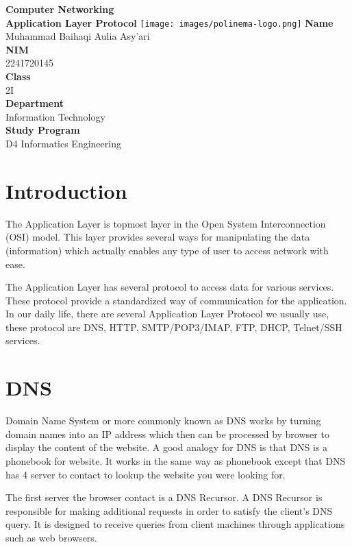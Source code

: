 \documentclass[12pt,titlepage]{article}
\newcommand{\vSubject}{Computer Networking}
\newcommand{\vSubtitle}{Application Layer Protocol}
\newcommand{\vName}{Muhammad Baihaqi Aulia Asy'ari}
\newcommand{\vNIM}{2241720145}
\newcommand{\vClass}{2I}
\newcommand{\vDepartment}{Information Technology}
\newcommand{\vStudyProgram}{D4 Informatics Engineering}
\begin{document}
\begin{titlepage}
    \centering
    \vfill
    {\bfseries\LARGE
        \vSubject\\
        \vskip0.25cm
        \vSubtitle
    }
    \vfill
    \texttt{[image: images/polinema-logo.png]}
    \vfill
    {
        \textbf{Name}\\
        \vName\\
        \vskip0.5cm
        \textbf{NIM}\\
        \vNIM\\
        \vskip0.5cm
        \textbf{Class}\\
        \vClass\\
        \vskip0.5cm
        \textbf{Department}\\
        \vDepartment\\
        \vskip0.5cm
        \textbf{Study Program}\\
        \vStudyProgram
    }
\end{titlepage}

\newpage

\section{Introduction}
The Application Layer is topmost layer in the Open System Interconnection (OSI) model. This layer provides several ways for manipulating the data (information) which actually enables any type of user to access network with ease. 

The Application Layer has several protocol to access data for various services. These protocol provide a standardized way of communication for the application. In our daily life, there are several Application Layer Protocol we usually use, these protocol are DNS, HTTP, SMTP/POP3/IMAP, FTP, DHCP, Telnet/SSH services.

\section{DNS}
Domain Name System or more commonly known as DNS works by turning domain names into an IP address which then can be processed by browser to display the content of the website. A good analogy for DNS is that DNS is a phonebook for website. It works in the same way as phonebook except that DNS has 4 server to contact to lookup the website you were looking for.

The first server the browser contact is a DNS Recursor. A DNS Recursor is responsible for making additional requests in order to satisfy the client's DNS query. It is designed to receive queries from client machines through applications such as web browsers.
\end{document}

